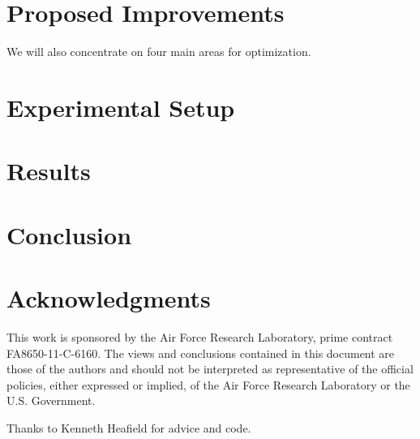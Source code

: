 \documentclass[]{article}
\begin{document}
\section{Proposed Improvements}
\label{sec:Proposed Improvements}

We will also concentrate on four main areas for optimization.


\section{Experimental Setup}
\label{sec:Experimental Setup}


\section{Results}
\label{sec:Results}



\section{Conclusion}



 \section*{Acknowledgments}
This work is sponsored by the Air Force Research Laboratory, prime contract FA8650-11-C-6160.  The views and conclusions contained in this document are those of the authors and should not be interpreted as representative of the official policies, either expressed or implied, of the Air Force Research Laboratory or the U.S. Government.

Thanks to Kenneth Heafield for advice and code.
\small



\end{document}
